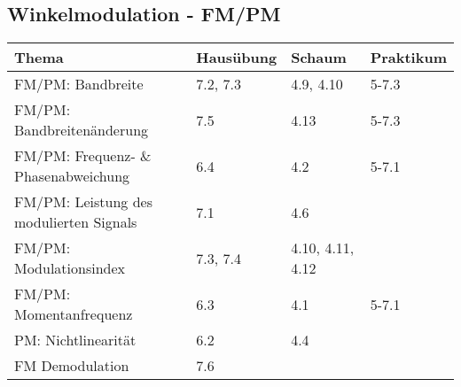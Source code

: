 \subsection{Winkelmodulation - FM/PM}
	\begin{tabular}{|p{9cm}|p{2.5cm}|p{3.5cm}|p{2cm}|}
	\hline
	\textbf{Thema} & \textbf{Hausübung} & \textbf{Schaum} & \textbf{Praktikum} \\ \hline
	FM/PM: Bandbreite & 7.2, 7.3 & 4.9, 4.10 & 5-7.3 \\ \hline
	FM/PM: Bandbreitenänderung & 7.5 & 4.13 & 5-7.3 \\ \hline
	FM/PM: Frequenz- \& Phasenabweichung & 6.4 & 4.2 & 5-7.1 \\ \hline
	FM/PM: Leistung des modulierten Signals & 7.1 & 4.6 &  \\ \hline
	FM/PM: Modulationsindex & 7.3, 7.4 & 4.10, 4.11, 4.12 &  \\ \hline
	FM/PM: Momentanfrequenz & 6.3 & 4.1 & 5-7.1 \\ \hline
	PM: Nichtlinearität & 6.2 & 4.4 &  \\ \hline
	FM Demodulation & 7.6 & & \\
	\hline
	\end{tabular}

